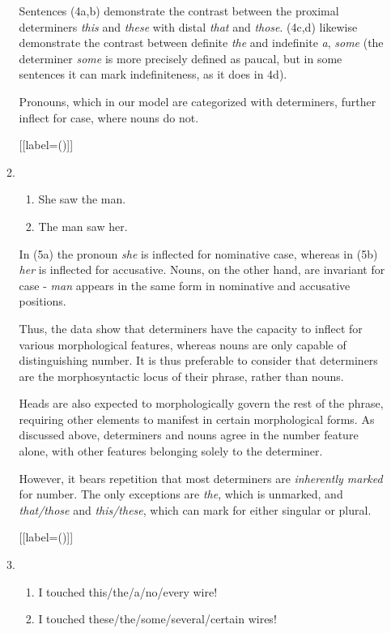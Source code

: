 \documentclass[12pt]{article}
\begin{document}
\begin{enumerate}[label=\textbf{\arabic*.}]
\begin{enumerate}[label=(\arabic*)]
Sentences (4a,b) demonstrate the contrast between the proximal determiners \emph{this} and \emph{these} with distal \emph{that} and \emph{those}. (4c,d) likewise demonstrate the contrast between definite \emph{the} and indefinite \emph{a}, \emph{some} (the determiner \emph{some} is more precisely defined as paucal, but in some sentences it can mark indefiniteness, as it does in 4d).

Pronouns, which in our model are categorized with determiners, further inflect for case, where nouns do not.

[{[label=(\arabic*)]}]
\item
\begin{enumerate}[label=\alph*.]
\item She saw the man.
\item The man saw her.
\end{enumerate}

In (5a) the pronoun \emph{she} is inflected for nominative case, whereas in (5b) \emph{her} is inflected for accusative.  Nouns, on the other hand, are invariant for case - \emph{man} appears in the same form in nominative and accusative positions.

Thus, the data show that determiners have the capacity to inflect for various morphological features, whereas nouns are only capable of distinguishing number. It is thus preferable to consider that determiners are the morphosyntactic locus of their phrase, rather than nouns.

Heads are also expected to morphologically govern the rest of the phrase, requiring other elements to manifest in certain morphological forms. As discussed above, determiners and nouns agree in the number feature alone, with other features belonging solely to the determiner.

However, it bears repetition that most determiners are \emph{inherently marked} for number. The only exceptions are \emph{the}, which is unmarked, and \emph{that/those} and \emph{this/these}, which can mark for either singular or plural.

[{[label=(\arabic*)]}]
\item
\begin{enumerate}[label=\alph*.]
\item I touched this/the/a/no/every wire!
\item I touched these/the/some/several/certain wires!
\end{enumerate}


\end{enumerate}
\end{enumerate}
\end{document}
